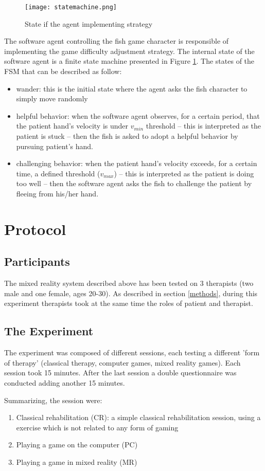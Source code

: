 \documentclass[preprint,authoryear,12pt]{elsarticle}
\begin{document}
\begin{figure}[h]
	\centering
		\texttt{[image: statemachine.png]}
	\caption{State if the agent implementing strategy}
	\label{fig:statemachine}
\end{figure}

The software agent controlling the fish game character is responsible of implementing the game difficulty adjustment strategy.
The internal state of the software agent is a finite state machine presented in Figure \ref{fig:statemachine}. The states of the FSM that can be described as follow:
\begin{itemize}
\item wander: this is the initial state where the agent asks the fish character to simply move randomly
\item helpful behavior: when the software agent observes, for a certain period, that the patient hand's velocity is under $v_{min}$ threshold -- this is interpreted as the patient is stuck -- then the fish is asked to adopt a helpful behavior by pursuing patient's hand.
\item challenging behavior: when the patient hand's velocity exceeds, for a certain time, a defined threshold ($v_{max}$) -- this is interpreted as the patient is doing too well -- then the software agent asks the fish to challenge the patient by fleeing from his/her hand.
\end{itemize}



\section{Protocol}
\label{protocol}
\subsection{Participants}
The mixed reality system described above has been tested on 3 therapists (two male and one female, ages 20-30). As described in section \ref{methods}, during  this experiment therapists  took at the same time the roles of patient and  therapist.
\par \medskip

\subsection{The Experiment}
The experiment was composed of different sessions, each testing a different 'form of therapy' (classical therapy, computer games, mixed reality games). Each session took 15 minutes. After the last session a double questionnaire was conducted adding another 15 minutes. \par \medskip
Summarizing, the session were:
\begin{enumerate}
\item Classical rehabilitation (CR): a simple classical rehabilitation session, using a exercise which is not related to any form of gaming
\item	 Playing a game on the computer (PC)
\item	 Playing a game in mixed reality (MR)
\end{enumerate}
\end{document}
